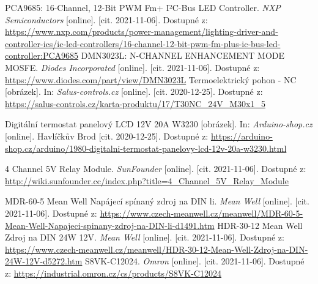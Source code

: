 \begin{thebibliography}{3}
PCA9685: 16-Channel, 12-Bit PWM Fm+ I²C-Bus LED Controller. \textit{NXP Semiconductors} [online]. [cit. 2021-11-06]. Dostupné z: \url{https://www.nxp.com/products/power-management/lighting-driver-and-controller-ics/ic-led-controllers/16-channel-12-bit-pwm-fm-plus-ic-bus-led-controller:PCA9685}
DMN3023L: N-CHANNEL ENHANCEMENT MODE MOSFE. \textit{Diodes Incorporated} [online]. [cit. 2021-11-06]. Dostupné z: \url{https://www.diodes.com/part/view/DMN3023L}
Termoelektrický pohon - NC [obrázek]. In: \textit{Salus-controls.cz} [online]. [cit. 2020-12-25]. Dostupné z: \url{https://salus-controls.cz/karta-produktu/17/T30NC\_24V\_M30x1\_5}

Digitální termostat panelový LCD 12V 20A W3230 [obrázek]. In: \textit{Arduino-shop.cz} [online]. Havlíčkův Brod [cit. 2020-12-25]. Dostupné z: \url{https://arduino-shop.cz/arduino/1980-digitalni-termostat-panelovy-lcd-12v-20a-w3230.html}

4 Channel 5V Relay Module. \textit{SunFounder} [online]. [cit. 2021-11-06]. Dostupné z: \url{http://wiki.sunfounder.cc/index.php?title=4_Channel_5V_Relay_Module}

MDR-60-5 Mean Well Napájecí spínaný zdroj na DIN li. \textit{Mean Well} [online]. [cit. 2021-11-06]. Dostupné z: \url{https://www.czech-meanwell.cz/meanwell/MDR-60-5-Mean-Well-Napajeci-spinany-zdroj-na-DIN-li-d1491.htm}
HDR-30-12 Mean Well Zdroj na DIN 24W 12V. \textit{Mean Well} [online]. [cit. 2021-11-06]. Dostupné z: \url{https://www.czech-meanwell.cz/meanwell/HDR-30-12-Mean-Well-Zdroj-na-DIN-24W-12V-d5272.htm}
S8VK-C12024. \textit{Omron} [online]. [cit. 2021-11-06]. Dostupné z: \url{https://industrial.omron.cz/cs/products/S8VK-C12024}


\end{thebibliography}
